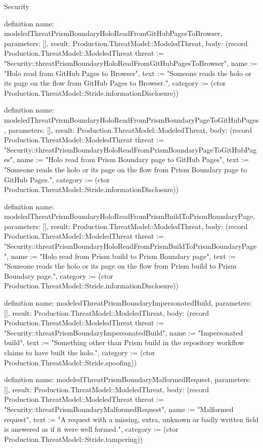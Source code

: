 \begin{lexlean}{Security}
\begin{semanticmodule}
definition{
  name: modeledThreatPrismBoundaryHoloReadFromGitHubPagesToBrowser,
  parameters: [],
  result: Production.ThreatModel::ModeledThreat,
  body: (record Production.ThreatModel::ModeledThreat {threat := "Security::threatPrismBoundaryHoloReadFromGitHubPagesToBrowser", name := "Holo read from GitHub Pages to Browser", text := "Someone reads the holo or its page on the flow from GitHub Pages to Browser.", category := (ctor Production.ThreatModel::Stride.informationDisclosure)})
}

definition{
  name: modeledThreatPrismBoundaryHoloReadFromPrismBoundaryPageToGitHubPages,
  parameters: [],
  result: Production.ThreatModel::ModeledThreat,
  body: (record Production.ThreatModel::ModeledThreat {threat := "Security::threatPrismBoundaryHoloReadFromPrismBoundaryPageToGitHubPages", name := "Holo read from Prism Boundary page to GitHub Pages", text := "Someone reads the holo or its page on the flow from Prism Boundary page to GitHub Pages.", category := (ctor Production.ThreatModel::Stride.informationDisclosure)})
}

definition{
  name: modeledThreatPrismBoundaryHoloReadFromPrismBuildToPrismBoundaryPage,
  parameters: [],
  result: Production.ThreatModel::ModeledThreat,
  body: (record Production.ThreatModel::ModeledThreat {threat := "Security::threatPrismBoundaryHoloReadFromPrismBuildToPrismBoundaryPage", name := "Holo read from Prism build to Prism Boundary page", text := "Someone reads the holo or its page on the flow from Prism build to Prism Boundary page.", category := (ctor Production.ThreatModel::Stride.informationDisclosure)})
}

definition{
  name: modeledThreatPrismBoundaryImpersonatedBuild,
  parameters: [],
  result: Production.ThreatModel::ModeledThreat,
  body: (record Production.ThreatModel::ModeledThreat {threat := "Security::threatPrismBoundaryImpersonatedBuild", name := "Impersonated build", text := "Something other than Prism build in the repository workflow claims to have built the holo.", category := (ctor Production.ThreatModel::Stride.spoofing)})
}

definition{
  name: modeledThreatPrismBoundaryMalformedRequest,
  parameters: [],
  result: Production.ThreatModel::ModeledThreat,
  body: (record Production.ThreatModel::ModeledThreat {threat := "Security::threatPrismBoundaryMalformedRequest", name := "Malformed request", text := "A request with a missing, extra, unknown or badly written field is answered as if it were well formed.", category := (ctor Production.ThreatModel::Stride.tampering)})
}


\end{semanticmodule}
\end{lexlean}
